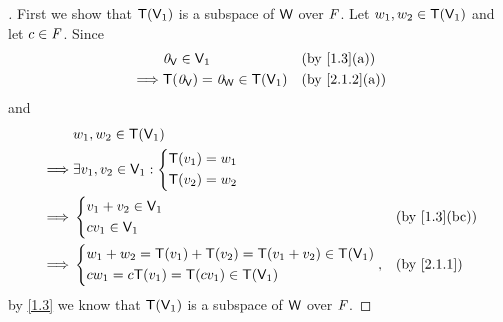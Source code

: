 \begin{proof}[]
	First we show that \(\mathsf{T}(\mathsf{V}_1)\) is a subspace of \(\mathsf{W}\) over \(\mathit{F}\).
	Let \(w_1, w_2 \in \mathsf{T}(\mathsf{V}_1)\) and let \(c \in \mathit{F}\).
	Since
	\begin{align*}
		         & \zv_{\V} \in \V_1                    &  & \by{1.3}[a]   \\
		\implies & \T(\zv_{\V}) = \zv_{\W} \in \T(\V_1) &  & \by{2.1.2}[a]
	\end{align*}
	and
	\begin{align*}
		         & w_1, w_2 \in \T(\V_1)                                                  \\
		\implies & \exists v_1, v_2 \in \V_1 : \begin{dcases}
			                                       \T(v_1) = w_1 \\
			                                       \T(v_2) = w_2
		                                       \end{dcases}                              \\
		\implies & \begin{dcases}
			           v_1 + v_2 \in \V_1 \\
			           c v_1 \in \V_1
		           \end{dcases}                                         &  & \by{1.3}[bc] \\
		\implies & \begin{dcases}
			           w_1 + w_2 = \T(v_1) + \T(v_2) = \T(v_1 + v_2) \in \T(\V_1) \\
			           c w_1 = c \T(v_1) = \T(c v_1) \in \T(\V_1)
		           \end{dcases}, &  & \by{2.1.1}
	\end{align*}
	by \cref{1.3} we know that \(\mathsf{T}(\mathsf{V}_1)\) is a subspace of \(\mathsf{W}\) over \(\mathit{F}\).


\end{proof}
